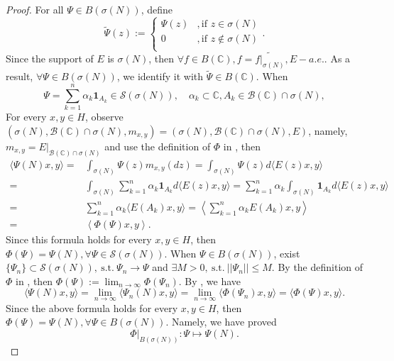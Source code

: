 \documentclass[12pt]{article}
\renewcommand{\b}{\mathscr{B}}
\renewcommand{\i}{\bm{1}}
\renewcommand{\(}{\left(}%
\renewcommand{\)}{\right)}%
\renewcommand{\[}{\left[}%
\renewcommand{\]}{\right]}%
\renewcommand{\c}{\mathbb{C}}
\newcommand{\st}{\mathrm{\ s.t.\ }}
\newcommand{\li}{\lim\limits_}
\newtheorem{proof}{Proof.}}
\begin{document}
  \begin{proof}
   For all $\Psi\in B(\sigma(N) )$, define
   \begin{equation*}
    \widetilde{\Psi}(z):=
    \begin{cases}
     \Psi(z)&,\mbox{if }z\in\sigma(N)\\
     0&,\mbox{if }z\notin \sigma(N)\\
    \end{cases}.
   \end{equation*}
    Since the support of $E$ is $\sigma(N)$, then $\forall f\in B(\c),f=\widetilde{ f|_{\sigma(N)}},E-a.e.$. As a result, $\forall\Psi\in B(\sigma(N))$, we identify it with $\widetilde{\Psi}\in B(\c )$. When
    \begin{equation*}
     \Psi=\sum_{k=1}^n\alpha_k\i_{A_k}\in\mathscr{S}(\sigma(N) ) ,\quad \alpha_k \subset \c,A_k\in \b(\c)\cap\sigma(N),
    \end{equation*}
     For every $x,y\in H$, observe $(\sigma(N),\b(\c)\cap\sigma(N),m_{x,y} )=(\sigma(N),\b(\c)\cap\sigma(N),E)$, namely, $m_{x,y}=E|_{\b(\c)\cap \sigma(N)}$ and use the definition of $\Phi$ in \cite[Theorem 2.5.29]{ref1}, then
    \begin{equation*}
     \begin{split}
      \langle \Psi(N)x,y \rangle=&\int_{\sigma(N)}\Psi(z)m_{x,y}(dz)=\int_{\sigma(N)}\Psi(z)d\langle E(z)x,y\rangle\\
      =&\int_{\sigma(N)}\sum_{k=1}^n\alpha_k\i_{A_k}d\langle E(z)x,y\rangle=\sum_{k=1}^n\alpha_k\int_{\sigma(N)}\i_{A_k} d\langle E(z)x,y\rangle\\
      =&\sum_{k=1}^n\alpha_k \langle E(A_k)x,y\rangle= \left\langle \sum_{k=1}^n\alpha_k E(A_k)x,y\right \rangle\\
      =&\left\langle \Phi(\Psi ) x,y\right \rangle.
     \end{split}
    \end{equation*}
    Since this formula holds for every $x,y\in H$, then $\Phi(\Psi )=\Psi(N),\forall \Psi\in \mathscr{S}(\sigma(N) ) $. When $\Psi\in B(\sigma(N) )$, exist $\{\Psi_n \}\subset \mathscr{S}(\sigma(N) ),\st \Psi_n\to \Psi$ and $\exists M>0,\st ||\Psi_n||\leq M$. By the definition of $\Phi$ in \cite[Theorem 2.5.29]{ref1}, then $\Phi(\Psi ):=\lim_{n\to\infty}\Phi(\Psi_n )$. By \cite[Theorem 2.5.20 (iii)]{ref1}, we have
    \begin{equation*}
     \langle \Psi(N)x,y \rangle=\li{n\to\infty}\langle \Psi_n(N)x,y \rangle=\li{n\to\infty}\langle \Phi(\Psi_n )x,y \rangle=\langle \Phi(\Psi )x,y \rangle.
    \end{equation*}
    Since the above formula holds for every $x,y\in H$, then $\Phi(\Psi )=\Psi(N),\forall \Psi\in B(\sigma(N) ) $. Namely, we have proved
    \begin{equation*}
    \Phi|_{B(\sigma(N) )}:\Psi\mapsto \Psi(N).
   \end{equation*}
  \end{proof}
\end{document}
